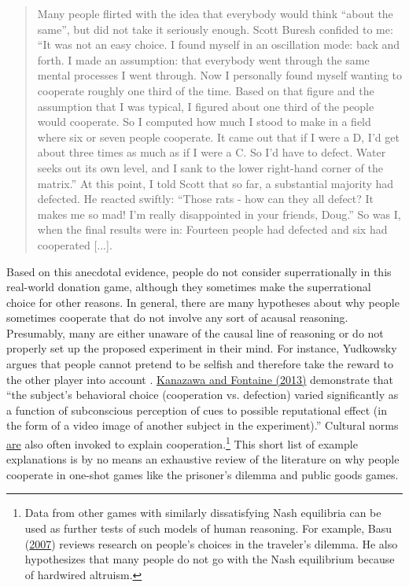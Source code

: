 \begin{quote}
Many people flirted with the idea that everybody would think ``about the
same'', but did not take it seriously enough. Scott Buresh confided to
me: ``It was not an easy choice. I found myself in an oscillation mode:
back and forth. I made an assumption: that everybody went through the
same mental processes I went through. Now I personally found myself
wanting to cooperate roughly one third of the time. Based on that figure
and the assumption that I was typical, I figured about one third of the
people would cooperate. So I computed how much I stood to make in a
field where six or seven people cooperate. It came out that if I were a
D, I'd get about three times as much as if I were a C. So I'd have to
defect. Water seeks out its own level, and I sank to the lower
right-hand corner of the matrix.'' At this point, I told Scott that so
far, a substantial majority had defected. He reacted swiftly: ``Those
rats - how can they all defect? It makes me so mad! I'm really
disappointed in your friends, Doug.'' So was I, when the final results
were in: Fourteen people had defected and six had cooperated {[}...{]}.
\end{quote}

Based on this anecdotal evidence, people do not consider superrationally
in this real-world donation game, although they sometimes make the
superrational choice for other reasons. In general, there are many
hypotheses about why people sometimes cooperate that do not involve any
sort of acausal reasoning. Presumably, many are either unaware of the
causal line of reasoning or do not properly set up the proposed
experiment in their mind. For instance, Yudkowsky
argues that people cannot
pretend to be selfish and therefore take the reward to the other player
into account \citeyear{Yudkowsky2015-tz}.
\href{http://personal.lse.ac.uk/kanazawa/pdfs/JNPE2013.pdf}{Kanazawa
and Fontaine (2013)} demonstrate that ``the subject's behavioral choice
(cooperation vs. defection) varied significantly as a function of
subconscious perception of cues to possible reputational effect (in the
form of a video image of another subject in the experiment).'' Cultural
norms
\href{https://en.wikipedia.org/wiki/Public_goods_game\#Applications_to_sociology}{are}
also often invoked to explain cooperation.\footnote{Data from other
  games with similarly dissatisfying Nash equilibria can be used as
  further tests of such models of human reasoning. For example, Basu
  (\href{http://www.cs.virginia.edu/~robins/The_Travelers_Dilemma.pdf}{2007})
  reviews research on people's choices in the traveler's dilemma. He
  also hypothesizes that many people do not go with the Nash equilibrium
  because of hardwired altruism.} This short list of example
explanations is by no means an exhaustive review of the literature on
why people cooperate in one-shot games like the prisoner's dilemma and
public goods games.

